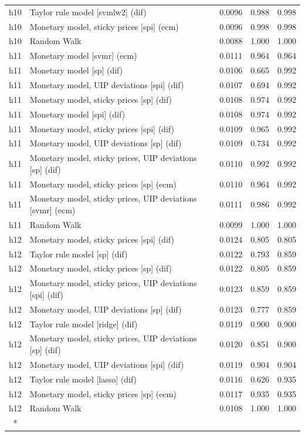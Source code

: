 \begin{ThreePartTable}
\begin{longtable}[t]{cp{5.5cm}ccc}
h10 & \raggedright Taylor rule model [svmlw2] (dif) & 0.0096 & 0.988 & 0.998\\
h10 & \raggedright Monetary model, sticky prices [spi] (ecm) & 0.0096 & 0.998 & 0.998\\
h10 & \raggedright Random Walk & 0.0088 & 1.000 & 1.000\\
\addlinespace
h11 & \raggedright Monetary model [svmr] (ecm) & 0.0111 & 0.964 & 0.964\\
h11 & \raggedright Monetary model [sp] (dif) & 0.0106 & 0.665 & 0.992\\
h11 & \raggedright Monetary model, UIP deviations [spi] (dif) & 0.0107 & 0.694 & 0.992\\
h11 & \raggedright Monetary model, sticky prices [sp] (dif) & 0.0108 & 0.974 & 0.992\\
h11 & \raggedright Monetary model [spi] (dif) & 0.0108 & 0.974 & 0.992\\
h11 & \raggedright Monetary model, sticky prices [spi] (dif) & 0.0109 & 0.965 & 0.992\\
h11 & \raggedright Monetary model, UIP deviations [sp] (dif) & 0.0109 & 0.734 & 0.992\\
h11 & \raggedright Monetary model, sticky prices, UIP deviations [sp] (dif) & 0.0110 & 0.992 & 0.992\\
h11 & \raggedright Monetary model, sticky prices [sp] (ecm) & 0.0110 & 0.964 & 0.992\\
h11 & \raggedright Monetary model, sticky prices, UIP deviations [svmr] (ecm) & 0.0111 & 0.986 & 0.992\\
h11 & \raggedright Random Walk & 0.0099 & 1.000 & 1.000\\
\addlinespace
h12 & \raggedright Monetary model, sticky prices [spi] (dif) & 0.0124 & 0.805 & 0.805\\
h12 & \raggedright Taylor rule model [sp] (dif) & 0.0122 & 0.793 & 0.859\\
h12 & \raggedright Monetary model, sticky prices [sp] (dif) & 0.0122 & 0.805 & 0.859\\
h12 & \raggedright Monetary model, sticky prices, UIP deviations [spi] (dif) & 0.0123 & 0.859 & 0.859\\
h12 & \raggedright Monetary model, UIP deviations [sp] (dif) & 0.0123 & 0.777 & 0.859\\
h12 & \raggedright Taylor rule model [ridge] (dif) & 0.0119 & 0.900 & 0.900\\
h12 & \raggedright Monetary model, sticky prices, UIP deviations [sp] (dif) & 0.0120 & 0.851 & 0.900\\
h12 & \raggedright Monetary model, UIP deviations [spi] (dif) & 0.0119 & 0.904 & 0.904\\
h12 & \raggedright Taylor rule model [lasso] (dif) & 0.0116 & 0.626 & 0.935\\
h12 & \raggedright Monetary model, sticky prices [sp] (ecm) & 0.0117 & 0.935 & 0.935\\
h12 & \raggedright Random Walk & 0.0108 & 1.000 & 1.000\\*
\end{longtable}
\end{ThreePartTable}
\endgroup{}

